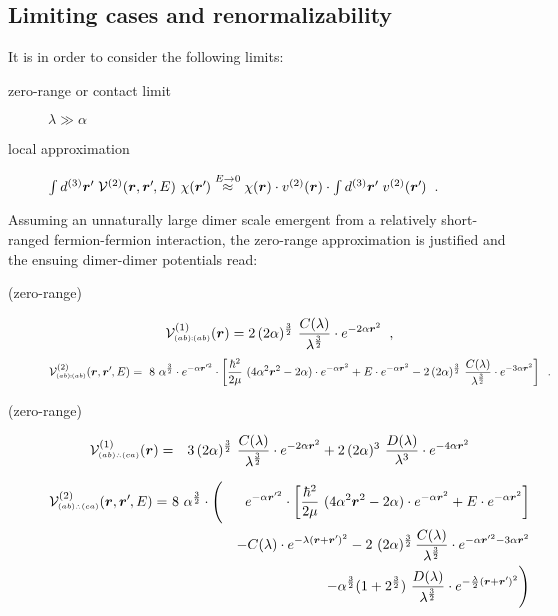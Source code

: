 \documentclass[onecolumn,preprint,superscriptaddress,nofootinbib,notitlepage,10pt,linenumbers]{revtex4-1}
\newcommand*{\mprime}{^{\prime}\mkern-1.2mu}
\newcommand{\be}{\begin{equation}}
\newcommand{\ee}{\end{equation}}
\newcommand{\ve}[1]{\ensuremath{\boldsymbol{#1}}}
\newcommand{\cc}{\ensuremath C(\lambda)}
\newcommand{\dd}{\ensuremath D(\lambda)}
\newcommand{\abab}{\ensuremath $(ab)\!\!:\!\!(ab)$}
\newcommand{\abca}{\ensuremath $(ab)\wasytherefore(ca)$}
\begin{document}
\newpage
\subsection{Limiting cases and renormalizability}

It is in order to consider the following limits: 
\begin{description}
\item[zero-range or contact limit]$\lambda\gg\alpha$
\item[local approximation]
$\int d^{(3)}\ve{r}\mprime~\mathcal{V}^{(2)}(\ve{r},\ve{r}\mprime,E)~\chi(\ve{r}\mprime)\stackrel{E\to 0}{\approx}
\chi(\ve{r})\cdot v^{(2)}(\ve{r})\cdot\int d^{(3)}\ve{r}\mprime~v^{(2)}(\ve{r}\mprime)$~.
\end{description}

Assuming an unnaturally large dimer scale emergent from a relatively short-ranged fermion-fermion interaction,
the zero-range approximation is justified and the ensuing dimer-dimer potentials read:

\begin{description}
	\item[(zero-range)~\abab]
\be
\mathcal{V}^{(1)}_{\text{\tiny\abab}}(\ve{r})=
2\,(2\alpha)^{\frac{3}{2}}~\frac{\cc}{\lambda^{\frac{3}{2}}}\cdot
 e^{-2\alpha\ve{r}^2}\;\;,
\ee
\be
\mathcal{V}^{(2)}_{\text{\tiny\abab}}(\ve{r},\ve{r}\mprime,E)=
~8~\alpha^{\frac{3}{2}}\cdot e^{-\alpha\ve{r}\mprime^2}\cdot
\left[\frac{\hbar^2}{2\mu}~(4\alpha^2\ve{r}^2-2\alpha)
\cdot e^{-\alpha\ve{r}^2}+
E\cdot e^{-\alpha\ve{r}^2}
-2\,(2\alpha)^{\frac{3}{2}}~\frac{\cc}{\lambda^{\frac{3}{2}}}\cdot
 e^{-3\alpha\ve{r}^2}\right]\;\;.
\ee

\item[(zero-range)~\abca]
\begin{eqnarray}
\mathcal{V}^{(1)}_{\text{\tiny\abca}}(\ve{r})&=&
3\,(2\alpha)^{\frac{3}{2}}~\frac{\cc}{\lambda^{\frac{3}{2}}}\cdot
 e^{-2\alpha\ve{r}^2}
 +2\,(2\alpha)^{3}~\frac{\dd}{\lambda^{3}}\cdot
 e^{-4\alpha\ve{r}^2}
\end{eqnarray}


\begin{eqnarray}
\mathcal{V}^{(2)}_{\text{\tiny\abca}}(\ve{r},\ve{r}\mprime,E)=&~8~\alpha^{\frac{3}{2}}\cdot\Bigg(&e^{-\alpha\ve{r}\mprime^2}\cdot
\left[\frac{\hbar^2}{2\mu}~(4\alpha^2\ve{r}^2-2\alpha)
\cdot e^{-\alpha\ve{r}^2}+
E\cdot e^{-\alpha\ve{r}^2}\right]\\
&&-\cc\cdot
 e^{-\lambda(\ve{r}+\ve{r}\mprime)^2}
-2~(2\alpha)^{\frac{3}{2}}\,\frac{\cc}{\lambda^{\frac{3}{2}}}\cdot
 e^{-\alpha\ve{r}\mprime^2-3\alpha\ve{r}^2}\\
 &&-\alpha^{\frac{3}{2}}(1+2^{\frac{3}{2}})~\frac{\dd}{\lambda^{\frac{3}{2}}}\cdot
 e^{-\frac{\lambda}{2}(\ve{r}+\ve{r}\mprime)^2}\Bigg)
\end{eqnarray}

\end{description}
\end{document}
